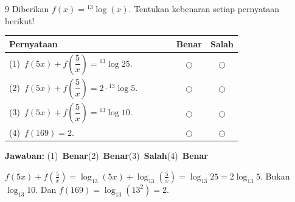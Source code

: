 \documentclass[11pt]{article}
\newcommand{\jawaban}[1]{%
  \noindent\colorbox{gold!30}{\parbox{\dimexpr\linewidth-2\fboxsep\relax}{%
    \textbf{Jawaban:} #1}}\par\smallskip}
\begin{document}
\begin{soal}{9}
Diberikan $f(x)={}^{13}\!\log(x)$.
Tentukan kebenaran setiap pernyataan berikut!

\par\smallskip
{\renewcommand{\arraystretch}{1.4}%
\begin{tabular}{@{}p{0.76\linewidth}cc@{}}
\hline
\textbf{Pernyataan} & \textbf{Benar} & \textbf{Salah}\\
\hline
(1)~$f(5x)+f\!\left(\dfrac{5}{x}\right)={}^{13}\!\log 25$.
  & $\bigcirc$ & $\bigcirc$\\[6pt]
(2)~$f(5x)+f\!\left(\dfrac{5}{x}\right)=2\cdot{}^{13}\!\log 5$.
  & $\bigcirc$ & $\bigcirc$\\[6pt]
(3)~$f(5x)+f\!\left(\dfrac{5}{x}\right)={}^{13}\!\log 10$.
  & $\bigcirc$ & $\bigcirc$\\[6pt]
(4)~$f(169)=2$.
  & $\bigcirc$ & $\bigcirc$\\
\hline
\end{tabular}}
\end{soal}
\begin{pembox}
\jawaban{(1)~\textbf{Benar}\quad(2)~\textbf{Benar}\quad(3)~\textbf{Salah}\quad(4)~\textbf{Benar}}
$f(5x)+f\!\left(\tfrac{5}{x}\right)=\log_{13}(5x)+\log_{13}\!\left(\tfrac{5}{x}\right)=\log_{13}25=2\log_{13}5$.
Bukan $\log_{13}10$. Dan $f(169)=\log_{13}(13^2)=2$. \checkmark
\end{pembox}
\end{document}
